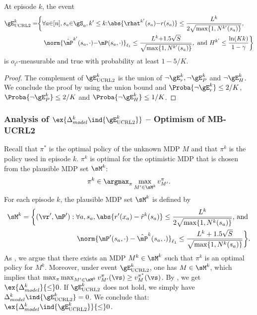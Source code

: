 \begin{subappendices}
\begin{lem}
    \label{lem:concentration_ucrl}
    At episode $k$, the event
    \begin{align*}
        \gE_\text{UCRL2}^{k} =
        &\bigg\{ \forall a{\in}[n], s_a{\in}\gS_a, k'\le k{:}
            \abs{\rhat^{k'}(s_a){-}r(s_a)} \le\frac{L^{k}}{2\sqrt{\max\{1,N^{k'}(s_a)\} }}, \\
        &\quad\norm{\hat{\mP}^{k'}(s_a,\cdot) {-}\mP(s_a,\cdot)}_{\ell_1} \le\frac{L^{k}{+}1.5\sqrt{S}}{\sqrt{\max\{1,N^{k'}(s_a)\} }}, \text{ and } H^{k'}\le \frac{\ln(Kk)}{1-\gamma} \bigg\}
    \end{align*}
    is $o_{t^k}$-measurable and true with probability at least $1-5/K$.
\end{lem}
\begin{proof}
    The complement of $\gE^{k}_\text{UCRL2}$ is the union of $\neg \gE^{k}_r, \neg \gE^{k}_P$ and $\neg \gE^{k}_H$. We conclude the proof by using the union bound and $\Proba{\neg \gE^{k}_r} \le 2/K$, $\Proba{\neg \gE^{k}_P} \le 2/K$ and $\Proba{\neg \gE^{k}_H} \le 1/K$. 
\end{proof}

\subsubsection{Analysis of $\ex{\Delta_{model}^k\ind{\gE^{k}_\text{UCRL2}}}$ -- Optimism of MB-UCRL2}

Recall that $\pi^*$ is the optimal policy of the unknown MDP $M$ and that $\pi^k$ is the policy used in episode $k$. $\pi^k$ is optimal for the optimistic MDP that is chosen from the plausible MDP set $\sM^k$:
\begin{align*}
    \pi^k \in \argmax_{\pi} \max_{M'\in\sM^k} v^\pi_{M'}.
\end{align*}
For each episode $k$, the plausible MDP set $\sM^k$ is defined by
\begin{align}
    \label{eq:plausible}
    \sM^k=\bigg\{(\vr',\mP'):\forall a, s_a, \abs{r'(x_a)-\hat{r}^{k}(s_a)} \le \frac{L^{k}}{2\sqrt{\max\{1,N^{k}(s_a)\} }} \text{, and }\nonumber\\
    \norm{\mP'(s_a,\cdot)-\hat{\mP}^{k}(s_a, .)}_{\ell_1} \le \frac{L^{k}+1.5\sqrt{S}}{\sqrt{\max\{1,N^{k}(s_a)\} }}\bigg\}.
\end{align}
As \cite{jaksch2010near}, we argue that there exists an MDP $M^k\in\sM^k$ such that $\pi^k$ is an optimal policy for $M^k$. Moreover, under event $\gE_\text{UCRL2}^{k}$, one has $M\in \sM^k$, which implies that $\max_{\pi}\max_{M'\in \sM^k} v^{\pi}_{M'}(\vs)\ge v^{\pi^*}_M(\vs)$. By , we get $\ex{\Delta_{model}^k}{\le} 0$.
If $\gE_\text{UCRL2}^{k}$ does not hold, we simply have $\Delta_{model}^k\ind{\gE^{k}_\text{UCRL2}}=0$. We conclude that: $\ex{\Delta_{model}^k\ind{\gE_\text{UCRL2}^{k}}}{\le}0$. 



\end{subappendices}
